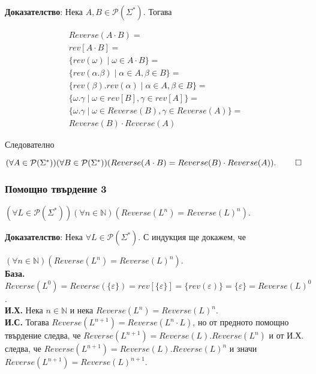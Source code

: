 \documentclass[12pt]{article}
\begin{document}
\vspace*{5mm}

\textbf{Доказателство}: Нека \(A, B \in \mathcal{P}(\Sigma^*)\). Тогава

\begin{align*}
    Reverse(A \cdot B) = \\
    rev[A \cdot B] = \\
    \{ rev(\omega) \mid \omega \in A \cdot B \} = \\
    \{ rev(\alpha.\beta) \mid \alpha \in A, \beta \in B \} = \\
    \{ rev(\beta).rev(\alpha) \mid \alpha \in A, \beta \in  B \} = \\
    \{ \omega.\gamma \mid \omega \in rev[B], \gamma \in rev[A] \} = \\
    \{ \omega.\gamma \mid \omega \in Reverse(B), \gamma \in Reverse(A) \} = \\
    Reverse(B) \cdot Reverse(A)
\end{align*}

Следователно

\((\forall A \in \mathcal{P}(\Sigma^*))(\forall B \in \mathcal{P}(\Sigma^*))( Reverse(A \cdot B) = Reverse(B) \cdot Reverse(A)). \; \qed\)

\subsubsection*{Помощно твърдение 3}
\((\forall L \in \mathcal{P}(\Sigma^*))(\forall n \in \mathbb N)( Reverse(L^n) = Reverse(L)^n)\).

\vspace*{5mm}

\textbf{Доказателство}: Нека \(\forall L \in \mathcal{P}(\Sigma^*)\).
С индукция ще докажем, че

\((\forall n \in \mathbb N)( Reverse(L^n) = Reverse(L)^n)\). \\

\textbf{База.}
\(Reverse(L^0) = Reverse(\{\varepsilon\}) = rev[\{\varepsilon\} ] = \{rev(\varepsilon)\} = \{\varepsilon\} = Reverse(L)^0\). \\

\textbf{И.Х.}
Нека \(n \in \mathbb N\) и нека \(Reverse(L^n) = Reverse(L)^n\). \\

\textbf{И.С.}
Тогава \(Reverse(L^{n + 1}) = Reverse(L^n \cdot L)\), но от предното помощно твърдение следва, че
\(Reverse(L^{n + 1}) = Reverse(L).Reverse(L^n) \) и от И.Х. следва, че
\(Reverse(L^{n + 1}) = Reverse(L).Reverse(L)^n \) и значи
\(Reverse(L^{n + 1}) = Reverse(L)^{n + 1} \). \\
\end{document}
